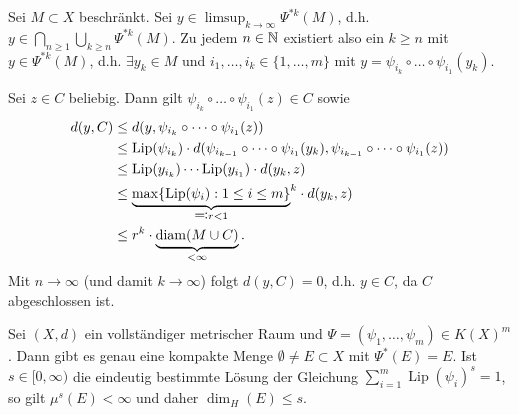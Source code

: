 \documentclass[a4paper,twoside,DIV15,BCOR12mm]{scrbook}
\DeclareMathOperator{\diam}{diam}
\DeclareMathOperator{\Lip}{Lip}
\begin{document}
\begin{beweis}
Sei \(M \subset X\) beschränkt. Sei \(y \in \limsup_{k\rightarrow\infty} \Psi^{\ast k}(M)\), d.h. \(y \in \bigcap_{n\geq1}\bigcup_{k\geq n} \Psi^{\ast k} (M)\). Zu jedem \(n\in\mathbb{N}\) existiert also ein \(k\geq n\) mit \(y\in\Psi^{\ast k}(M)\), d.h. \(\exists y_k \in M\) und \(i_1,\dots,i_k \in \{1,\dots,m\}\) mit \(y = \psi_{i_k}\circ\dots\circ\psi_{i_1}(y_k)\). 
\par
Sei \(z \in C\) beliebig. Dann gilt \(\psi_{i_k}\circ\dots\circ\psi_{i_1}(z) \in C\) sowie
\begin{align*}
d(y,C) & \leq d(y,\psi_{i_k}\circ\dots\circ\psi_{i_1}(z)) \\
& \leq \Lip(\psi_{i_k}) \cdot d(\psi_{i_{k-1}}\circ\dots\circ\psi_{i_1}(y_k), \psi_{i_{k-1}}\circ\dots\circ\psi_{i_1}(z)) \\
& \leq \Lip(y_{i_k}) \cdots \Lip(y_{i_1}) \cdot d(y_k, z) \\
& \leq {\underbrace{\max\{\Lip(\psi_i): 1 \leq i \leq m\}}_{\ad r < 1}}^k \cdot d(y_k,z) \\
& \le r^k \cdot \underbrace{\diam(M\cup C)}_{<\infty}.
\end{align*}
Mit \(n\rightarrow\infty \) (und damit \( k\rightarrow\infty\)) folgt \(d(y,C)=0\), d.h. \(y\in C\), da \(C\) abgeschlossen ist.
\end{beweis}

\begin{satz}
\label{satz:2.24}
Sei $(X,d)$ ein vollständiger metrischer Raum und $\Psi=(\psi_1,\ldots,\psi_m)\in K(X)^m$. Dann gibt es genau eine kompakte Menge $\emptyset \ne E\subset X$ mit $\Psi^*(E) = E$. Ist $s\in[0,\infty)$ die eindeutig bestimmte Lösung der Gleichung $\sum_{i=1}^m \Lip(\psi_i)^s = 1$, so gilt $\mu^s(E)<\infty$ und daher $\dim_H(E) \le s$.
\end{satz}
\end{document}
